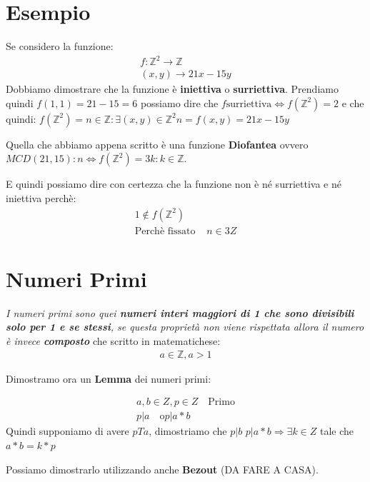 \documentclass{article}
\begin{document}
\newpage
\section{Esempio}
Se considero la funzione:
\begin{align}
        f :  \mathbb{Z}^{2} \rightarrow \mathbb{Z} \\
        (x,y) \rightarrow 21x - 15y
\end{align}
Dobbiamo dimostrare che la funzione è \textbf{iniettiva} o \textbf{surriettiva}.
Prendiamo quindi $f(1,1) = 21 - 15 = 6$ possiamo dire che \newline
$f \textrm{surriettiva} \Leftrightarrow f(\mathbb{Z}^{2}) = 2$
e che quindi:
$f(\mathbb{Z}^{2}) = {n \in \mathbb{Z} : \exists(x,y) \in \mathbb{Z}^{2} n=f(x,y)=21x - 15y} $

Quella che abbiamo appena scritto è una funzione \textbf{Diofantea} ovvero $MCD(21,15) : n \Leftrightarrow f(\mathbb{Z}^{2})={3k : k \in \mathbb{Z}}$. \par

E quindi possiamo dire con certezza che la funzione non è né surriettiva e né iniettiva perchè:
\begin{align*}
        1 \notin f(\mathbb{Z}^{2}) \\
        \textrm{Perchè fissato } & n \in 3Z
\end{align*}




\newpage
\section{Numeri Primi}
\textit{I numeri primi sono quei \textbf{numeri interi maggiori di 1 che sono divisibili solo per 1 e se stessi}, se questa proprietà non viene rispettata allora il numero è invece \textbf{composto}} che scritto in matematichese:
\begin{align}
       a \in \mathbb{Z}, a>1
\end{align}

Dimostramo ora un \textbf{Lemma} dei numeri primi:

\begin{align}
        a,b \in Z, p \in Z \quad \textrm{Primo} \\
        p | a \quad \textrm{o} p | a*b
\end{align}
Quindi supponiamo di avere $p T a$, dimostriamo che $p|b$
$p | a*b \Rightarrow \exists k \in Z$ tale che $a*b = k*p$

Possiamo dimostrarlo utilizzando anche \textbf{Bezout} (DA FARE A CASA).
\end{document}
